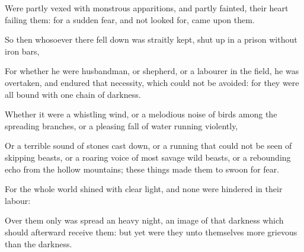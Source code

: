 {\par }{\PP {}Were partly vexed with monstrous apparitions, and partly fainted, their heart failing them: for a sudden fear, and not looked for, came upon them.
\par }{\PP {}So then whosoever there fell down was straitly kept, shut up in a prison without iron bars,
\par }{\PP {}For whether he were husbandman, or shepherd, or a labourer in the field, he was overtaken, and endured that necessity, which could not be avoided: for they were all bound with one chain of darkness.
\par }{\PP {}Whether it were a whistling wind, or a melodious noise of birds among the spreading branches, or a pleasing fall of water running violently,
\par }{\PP {}Or a terrible sound of stones cast down, or a running that could not be seen of skipping beasts, or a roaring voice of most savage wild beasts, or a rebounding echo from the hollow mountains; these things made them to swoon for fear.
\par }{\PP {}For the whole world shined with clear light, and none were hindered in their labour:
\par }{\PP {}Over them only was spread an heavy night, an image of that darkness which should afterward receive them: but yet were they unto themselves more grievous than the darkness.

}
